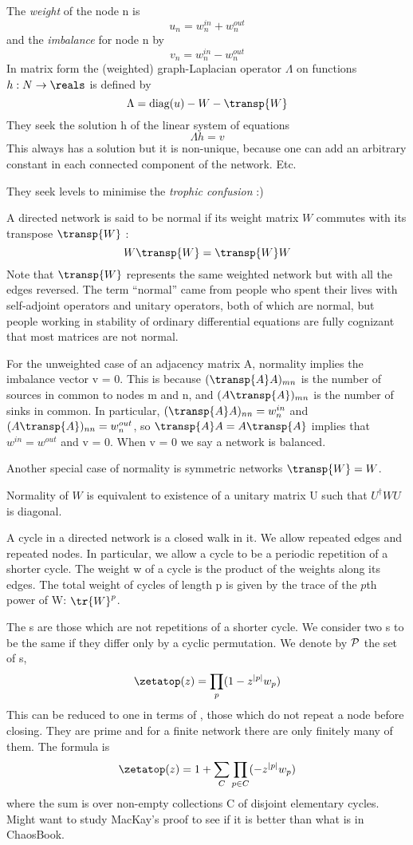 \begin{description}
{The \emph{weight} of the node n is
\[
  u_n = w_n^{in}+ w_n^{out}
\]
and the \emph{imbalance} for node n by
\[
  v_n = w_n^{in}-w_n^{out}
\]
In matrix form the (weighted) graph-Laplacian operator $\Lambda$ on
functions $h:N\to\reals$ is defined by
\[
  \Lambda = \mbox{diag}(u)-W-\transp{W}
\]
They seek the solution h of the linear system of equations
\[
  \Lambda h = v
\]
This always has a solution but it is non-unique, because one can add an
arbitrary constant in each connected component of the network. Etc.

They seek levels to minimise the \emph{trophic confusion} :)

A directed network is said to be normal if its
weight matrix ${W}$ commutes with its transpose $\transp{W}$ :
\[
  W\transp{W} = \transp{W}W
\]
Note that $\transp{W}$ represents the same weighted network but
with all the edges reversed.
                                                \toCB
The term ``normal'' came
from people who spent their lives with self-adjoint operators
and unitary operators, both of which are normal, but people
working in stability of ordinary differential equations are fully
cognizant that most matrices are not normal.

For the unweighted case of an adjacency matrix A, normality
implies the imbalance vector v = 0. This is because
$(\transp{A}A)_{mn}$ is the number of sources in common to nodes m and
n, and $(A\transp{A})_{mn}$ is the number of sinks in common. In particular,
$(\transp{A}A)_{nn}= w_n^{in}$
and $(A\transp{A})_{nn}= w_n^{out}$, so $\transp{A}A=A\transp{A}$
implies that $w^{in} = w^{out}$ and v = 0.
When v = 0 we say a network is balanced.

Another special case of normality is symmetric networks $ \transp{W}=W$.

Normality of ${W}$ is equivalent to existence of a unitary
matrix U such that $U^\dagger{W}U$ is diagonal.

A cycle in a directed network is a closed walk in it. We allow repeated
edges and repeated nodes. In particular, we allow a cycle to be a
periodic repetition of a shorter cycle. The weight w of a cycle is the
product of the weights along its edges.
The total weight of cycles of length p is given by the
trace of the $p$th power of W: $\tr{W}^p$.

                                                \toCB
The {\orbit}s are those which are
not repetitions of a shorter cycle. We consider two {\orbit}s to
be the same if they differ only by a cyclic permutation. We denote
by ${\cal P}$ the set of {\orbit}s,
\[
  \zetatop(z) = \prod_p (1-z^\cl{p}w_p)
\]
This can be reduced to one in terms of ,
those which do not repeat a node before closing. They are prime
and for a finite network there are only finitely many of them. The
formula is
\[
  \zetatop(z) = 1 + \sum_C\prod_{p\in C} (-z^\cl{p}w_p)
\]
where the sum is over non-empty collections C of disjoint elementary
cycles. Might want to study MacKay's proof to see if it is better than
what is in ChaosBook.
}


\end{description}
